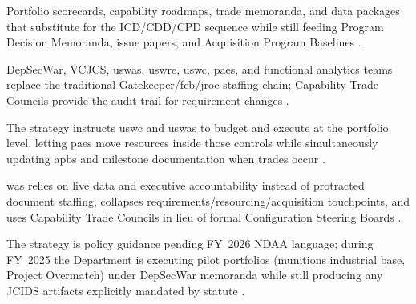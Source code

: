 \documentclass[../main.tex]{subfiles}
\begin{document}
\begin{description}[style=nextline,labelsep=0.5em,font=\bfseries]
  \item[\textbf{Outputs.}] Portfolio scorecards, capability roadmaps, trade memoranda, and data packages that substitute for the ICD/CDD/CPD sequence while still feeding Program Decision Memoranda, issue papers, and Acquisition Program Baselines \autocite{secwar-acq-transformation-2025}.
  \item[\textbf{Key players.}] DepSecWar, VCJCS, \ac{uswas}, \ac{uswre}, \ac{uswc}, \acp{pae}, and functional analytics teams replace the traditional Gatekeeper/\ac{fcb}/\ac{jroc} staffing chain; Capability Trade Councils provide the audit trail for requirement changes \autocite{secwar-acq-transformation-2025}.
  \item[\textbf{Integration with PPBE and the \ac{das}.}] The strategy instructs \ac{uswc} and \ac{uswas} to budget and execute at the portfolio level, letting \acp{pae} move resources inside those controls while simultaneously updating \ac{apb}s and milestone documentation when trades occur \autocite{secwar-acq-transformation-2025}.
  \item[\textbf{Differences from \ac{jcids}.}] \ac{was} relies on live data and executive accountability instead of protracted document staffing, collapses requirements/resourcing/acquisition touchpoints, and uses Capability Trade Councils in lieu of formal Configuration Steering Boards \autocite{secwar-acq-transformation-2025}.
  \item[\textbf{Legislative status.}] The strategy is policy guidance pending FY~2026 NDAA language; during FY~2025 the Department is executing pilot portfolios (munitions industrial base, Project Overmatch) under DepSecWar memoranda while still producing any JCIDS artifacts explicitly mandated by statute \autocite{secwar-acq-transformation-2025}.
\end{description}
\end{document}

